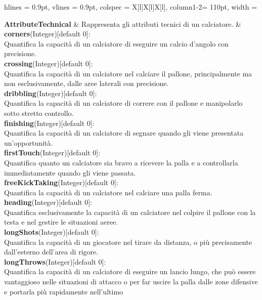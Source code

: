 \begin{tblr}{
    hlines = {0.9pt}, vlines = {0.9pt}, colspec = {X[l]X[l]X[l]}, column{1-2}= {110pt},
    width = \textwidth
}

	{
		\textbf{AttributeTechnical}
	}
	&
	{
		Rappresenta gli attributi tecnici di un calciatore.
	}
	&
	{
		\textbf{corners}(Integer)[default 0]:\\
			Quantifica la capacità di un calciatore
			di eseguire un calcio d'angolo con precisione.\\
		\medskip\textbf{crossing}(Integer)[default 0]:\\
			Quantifica la capacità di un calciatore
			nel calciare il pallone, principalmente
			ma non esclusivamente, dalle aree laterali
			con precisione.\\
		\medskip\textbf{dribbling}(Integer)[default 0]:\\
			Quantifica la capacità di un calciatore
			di correre con il pallone e manipolarlo
			sotto stretto controllo.\\
		\medskip\textbf{finishing}(Integer)[default 0]:\\
			Quantifica la capacità di un calciatore
			di segnare quando gli viene presentata
			un'opportunità.\\
		\medskip\textbf{firstTouch}(Integer)[default 0]:\\
			Quantifica quanto un calciatore sia bravo
			a ricevere la palla e a controllarla
			immediatamente quando gli viene passata.\\ 
		\medskip\textbf{freeKickTaking}(Integer)[default 0]:\\
			Quantifica la capacità di un calciatore
			nel calciare una palla ferma.\\
		\medskip\textbf{heading}(Integer)[default 0]:\\
			Quantifica esclusivamente la capacità
			di un calciatore nel colpire il pallone
			con la testa e nel gestire le situazioni aeree.\\
		\medskip\textbf{longShots}(Integer)[default 0]:\\
			Quantifica la capacità di un giocatore
			nel tirare da distanza, o più precisamente
			dall'esterno dell'area di rigore.\\
		\medskip\textbf{longThrows}(Integer)[default 0]:\\
			Quantifica la capacità di un calciatore di eseguire
			un lancio lungo, che può essere vantaggioso
			nelle situazioni di attacco o per far uscire
			la palla dalle zone difensive e
			portarla più rapidamente nell'ultimo
}
\end{tblr}
